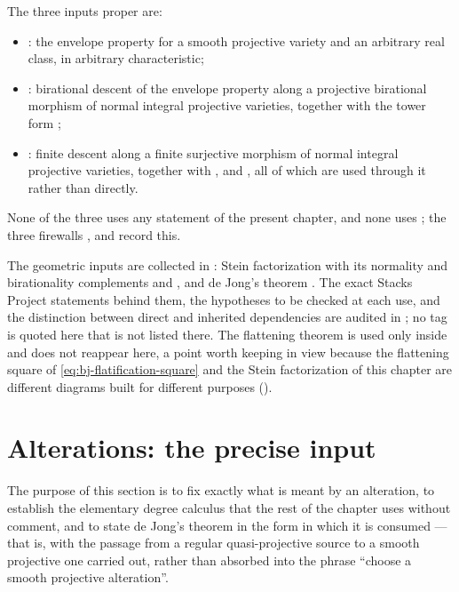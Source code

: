 The three inputs proper are:
\begin{itemize}
\item {}: the envelope property for a smooth
      projective variety and an arbitrary real class, in arbitrary
      characteristic;
\item {}: birational descent of the
      envelope property along a projective birational morphism of normal
      integral projective varieties, together with the tower form
      ;
\item {}: finite descent along a finite
      surjective morphism of normal integral projective varieties, together
      with ,
       and
      , all of which are used through it
      rather than directly.
\end{itemize}
None of the three uses any statement of the present chapter, and none uses
; the three firewalls
,  and
 record this.

The geometric inputs are collected in :
Stein factorization  with its normality
and birationality complements  and
, and de Jong's theorem
.  The exact Stacks Project statements behind them,
the hypotheses to be checked at each use, and the distinction between direct
and inherited dependencies are audited in ; no tag is
quoted here that is not listed there.  The flattening theorem
 is used only inside
 and does not reappear here, a point worth
keeping in view because the flattening square of
\eqref{eq:bj-flatification-square} and the Stein factorization of this
chapter are different diagrams built for different purposes
().

\section{Alterations: the precise input}
\label{sec:ch42-alterations}

The purpose of this section is to fix exactly what is meant by an alteration,
to establish the elementary degree calculus that the rest of the chapter
uses without comment, and to state de Jong's theorem in the form in which it
is consumed --- that is, with the passage from a regular quasi-projective
source to a smooth projective one carried out, rather than absorbed into the
phrase ``choose a smooth projective alteration''.

